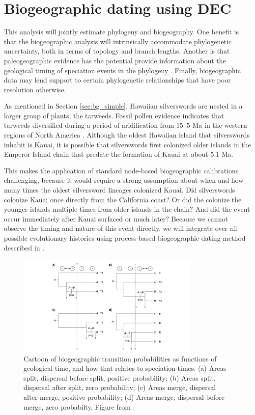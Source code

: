 

\section{Biogeographic dating using DEC} \label{sec:bg_phylo}

This analysis will jointly estimate phylogeny and biogeography.
One benefit is that the biogeographic analysis will intrinsically accommodate phylogenetic uncertainty, both in terms of topology and branch lengths.
Another is that paleogeographic evidence has the potential provide information about the geological timing of speciation events in the phylogeny \citep{Ho2015}.
Finally, biogeographic data may lend support to certain phylogenetic relationships that have poor resolution otherwise.

As mentioned in Section \ref{sec:bg_simple}, Hawaiian silverswords are nested in a larger group of plants, the tarweeds.
Fossil pollen evidence indicates that tarweeds diversified during a period of aridification from 15--5 Ma in the western regions of North America \citep{Baldwin1991}.
Although the oldest Hawaiian island that silverswords inhabit is Kauai, it is possible that silverswords first colonized older islands in the Emperor Island chain that predate the formation of Kauai at about 5.1 Ma.

This makes the application of standard node-based biogeographic calibrations challenging, because it would require a strong assumption about when and how many times the oldest silversword lineages colonized Kauai.
Did silverswords colonize Kauai once directly from the California coast? Or did the colonize the younger islands multiple times from older islands in the chain? And did the event occur immediately after Kauai surfaced or much later? Because we cannot observe the timing and nature of this event directly, we will integrate over all possible evolutionary histories using process-based biogeographic dating method described in \citet{Landis2016}.

\begin{figure}[!h]
\centering
\includegraphics[width=0.8\textwidth]{figures/fig_biogeo_dating.png}
\caption{Cartoon of biogeographic transition probabilities as functions of geological time, and how that relates to speciation times. (a) Areas split, dispersal before split, positive probability; (b) Areas split, dispersal after split, zero probability; (c) Areas merge, dispersal after merge, positive probability; (d) Areas merge, dispersal before merge, zero probabilty. Figure from \citet{Landis2016}.}
\label{fig:biogeo_dating_cartoon}
\end{figure}

